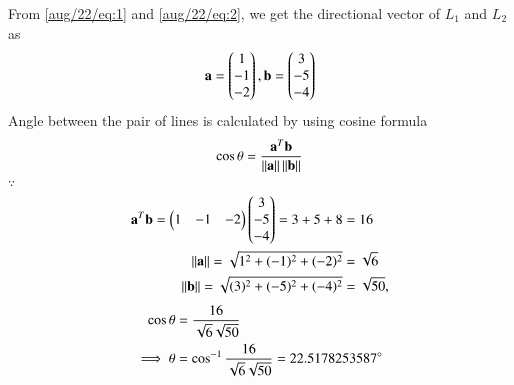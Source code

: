 From \eqref{aug/22/eq:1} and \eqref{aug/22/eq:2}, we get the directional vector of $ L_1 $ and $ L_2 $ as
\begin{align}
    \mathbf{a} = \begin{pmatrix}1 \\ -1 \\ -2\end{pmatrix} , 
    \mathbf{b} =\begin{pmatrix}3 \\ -5 \\ -4\end{pmatrix} \label{aug/22/eq:4}
\end{align}
Angle between the pair of lines is calculated by using cosine formula
\begin{align}
\cos \theta =\frac{\mathbf{a}^T\mathbf{b}}{\left\lVert\mathbf{a}\right\rVert\left\lVert\mathbf{b}\right\rVert}
\end{align}
$\because$
\begin{align}
\mathbf{a}^T \mathbf{b} =\begin{pmatrix}1 &-1 & -2\end{pmatrix} \begin{pmatrix}3\\-5\\-4\end{pmatrix} =3+5+8 &=16 \label{aug/22/eq:atb} \\
\left\lVert\mathbf{a}\right\rVert =\sqrt{1^2+(-1)^2+(-2)^2} &=\sqrt{6} \label{aug/22/a}\\
\left\lVert\mathbf{b}\right\rVert =\sqrt{(3)^2+(-5)^2+(-4)^2} &=\sqrt{50} \label{aug/22/b},
\end{align}
\begin{align}
\cos \theta &=\frac{16}{\sqrt{6}\sqrt{50}} \\
\implies \theta &= \cos^{-1}{\frac{16}{\sqrt{6}\sqrt{50}}} = 22.5178253587 \degree
\end{align}